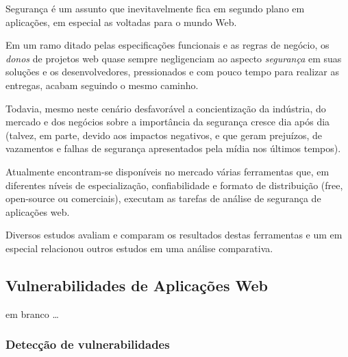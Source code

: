 ﻿\documentclass[twocolumn,showpacs,%
  nofootinbib,aps,superscriptaddress,%
  eqsecnum,prd,notitlepage,showkeys,10pt]{revtex4-1}
\begin{document}
Segurança é um assunto que inevitavelmente fica em segundo plano em aplicações, em especial as voltadas para o mundo Web.

Em um ramo ditado pelas especificações funcionais e as regras de negócio, os \emph{donos} de projetos web quase sempre negligenciam ao aspecto \emph{segurança} em suas soluções e os desenvolvedores, pressionados e com pouco tempo para realizar as entregas, acabam seguindo o mesmo caminho.

Todavia, mesmo neste cenário desfavorável a concientização da indústria, do mercado e dos negócios sobre a importância da segurança cresce dia após dia (talvez, em parte, devido aos impactos negativos, e que geram prejuízos, de vazamentos e falhas de segurança apresentados pela mídia nos últimos tempos).

Atualmente encontram-se disponíveis no mercado várias ferramentas que, em diferentes níveis de especialização, confiabilidade e formato de distribuição (free, open-source ou comerciais), executam as tarefas de análise de segurança de aplicações web.

Diversos estudos avaliam e comparam os resultados destas ferramentas e um em especial \cite{metwas} relacionou outros estudos em uma análise comparativa.
 







\subsection{Vulnerabilidades de Aplicações Web}

em branco \dots

\subsubsection{Detecção de vulnerabilidades}
\end{document}
